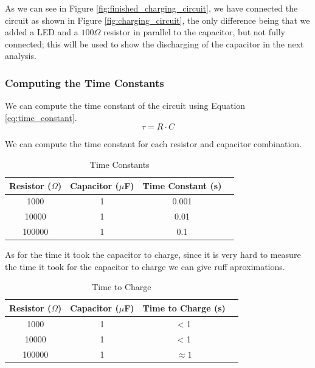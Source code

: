\documentclass[a4paper, 10pt]{article}
\begin{document}
							As we can see in Figure \ref{fig:finished_charging_circuit}, we have connected the circuit as 
							shown in Figure \ref{fig:charging_circuit}, the only difference being that we
							added a LED and a $100 \Omega$ resistor in parallel to the capacitor, but not fully connected;
							this will be used to show the discharging of the capacitor in the next analysis.

						\pagebreak
						\subsubsection{Computing the Time Constants}
							We can compute the time constant of the circuit using Equation \ref{eq:time_constant}.
							\begin{equation*}
								\tau = R \cdot C
							\end{equation*}

							We can compute the time constant for each resistor and capacitor combination.
							\begin{table}[h!]
								\centering
								\begin{tabular}{|c|c|c|c|}
									\hline
									\textbf{Resistor ($\Omega$)} & \textbf{Capacitor ($\mu$F)} & \textbf{Time Constant (s)}\\
									\hline
									1000 & 1 & 0.001\\
									10000 & 1 & 0.01\\
									100000 & 1 & 0.1\\
									\hline
								\end{tabular}
								\caption{Time Constants}
								\label{table:time_constants}
							\end{table}

							As for the time it took the capacitor to charge, since it is very hard to measure the time it took for the capacitor to charge we can give ruff aproximations.
							\begin{table}[h!]
								\centering
								\begin{tabular}{|c|c|c|c|}
									\hline
									\textbf{Resistor ($\Omega$)} & \textbf{Capacitor ($\mu$F)} & \textbf{Time to Charge (s)}\\
									\hline
									1000 & 1 & < 1 \\
									10000 & 1 & < 1 \\
									100000 & 1 & $\approx 1$ \\
									\hline
								\end{tabular}
								\caption{Time to Charge}
								\label{table:time_to_charge}
							\end{table}
\end{document}
